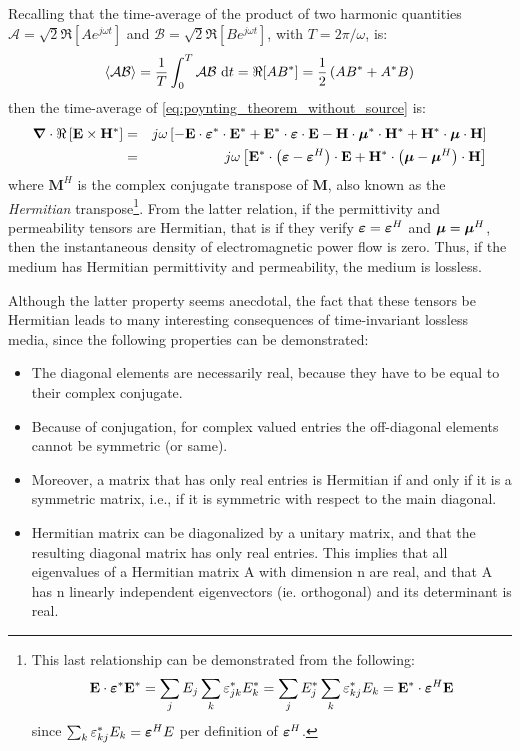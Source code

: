 Recalling that the time-average of the product of two harmonic quantities $\mathcal{A}=\sqrt{2}\Re[Ae^{j\omega t}]$ and $\mathcal{B}=\sqrt{2}\Re[Be^{j\omega t}]$, with $T=2\pi/\omega$, is:
\begin{equation}
\left< \mathcal{A} \mathcal{B}\right>
=
\frac{1}{T} \int_0^T \mathcal{A} \mathcal{B} \, \mathop{}\!\mathrm{d} t
= \Re[AB^*] = \frac{1}{2}\left(AB^* + A^* B \right)
\end{equation}
then the time-average of \ref{eq:poynting_theorem_without_source} is:
\begin{eqnarray*}
\boldsymbol{\nabla}\cdot \Re \left[ \mathbf{E} \times \mathbf{H}^*  \right]
&=&
j \omega \left[ 
-\mathbf{E}\cdot\boldsymbol{\varepsilon}^* \cdot \mathbf{E}^* + \mathbf{E}^*\cdot\boldsymbol{\varepsilon} \cdot \mathbf{E} 
-\mathbf{H}\cdot\boldsymbol{\mu}^* \cdot \mathbf{H}^* + \mathbf{H}^*\cdot\boldsymbol{\mu} \cdot \mathbf{H}
\right]
\\
&=& 
j \omega \left[ 
\mathbf{E}^*\cdot\left(\boldsymbol{\varepsilon} - \boldsymbol{\varepsilon}^H\right) \cdot \mathbf{E} +
\mathbf{H}^*\cdot\left(\boldsymbol{\mu} - \boldsymbol{\mu}^H\right) \cdot \mathbf{H}
\right]
\end{eqnarray*}
where $\mathbf{M}^H$ is the complex conjugate transpose of $\mathbf{M}$, also known as the \emph{Hermitian} transpose\footnote{This last relationship can be demonstrated from the following: 
$$
\mathbf{E}\cdot\boldsymbol{\varepsilon}^*\mathbf{E}^* = \sum_j E_j \sum_{k} \varepsilon^{*}_{jk} E_k^* = \sum_j E_j^* \sum_{k} \varepsilon^{*}_{kj} E_k=\mathbf{E}^*\cdot\boldsymbol{\varepsilon}^H\mathbf{E}
$$ since $\sum_{k} \varepsilon^{*}_{kj} E_k=\boldsymbol{\varepsilon}^H E$ per definition of $\boldsymbol{\varepsilon}^H$.}. From the latter relation, if the permittivity and permeability tensors are Hermitian, that is if they verify $\boldsymbol{\varepsilon}=\boldsymbol{\varepsilon}^H$ and $\boldsymbol{\mu}=\boldsymbol{\mu}^H$, then the instantaneous density of electromagnetic power flow is zero. Thus, if the medium has Hermitian permittivity and permeability, the medium is lossless. 

Although the latter property seems anecdotal, the fact that these tensors be Hermitian leads to many interesting consequences of time-invariant lossless media, since the following properties can be demonstrated:
\begin{itemize}
 \item The diagonal elements are necessarily real, because they have to be equal to their complex conjugate.
 \item Because of conjugation, for complex valued entries the off-diagonal elements cannot be symmetric (or same). \item Moreover, a matrix that has only real entries is Hermitian if and only if it is a symmetric matrix, i.e., if it is symmetric with respect to the main diagonal. 
 \item Hermitian matrix can be diagonalized by a unitary matrix, and that the resulting diagonal matrix has only real entries. This implies that all eigenvalues of a Hermitian matrix A with dimension n are real, and that A has n linearly independent eigenvectors (ie. orthogonal) and its determinant is real.      
\end{itemize}


